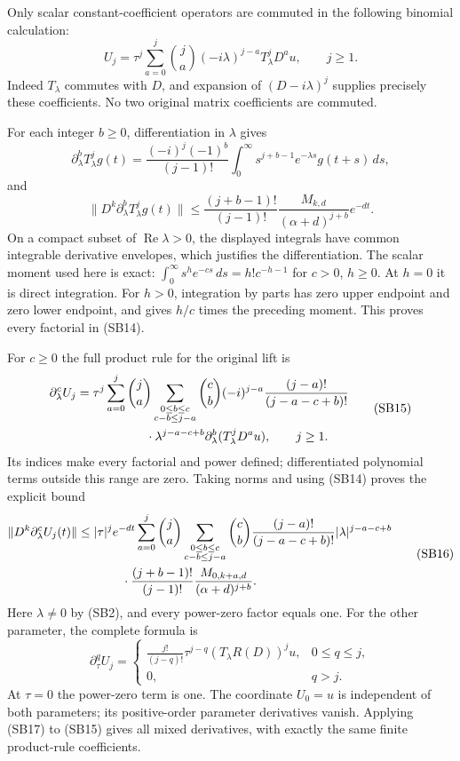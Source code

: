 \documentclass[
  11pt,
]{article}
\begin{document}
Only scalar constant-coefficient operators are commuted in the following
binomial calculation: \[
 U_j=\tau^j\sum_{a=0}^j\binom ja(-i\lambda)^{j-a}
                      T_\lambda^jD^au,\qquad j\geq1.
 \tag{SB12}
\] Indeed \(T_\lambda\) commutes with \(D\), and expansion of
\((D-i\lambda)^j\) supplies precisely these coefficients. No two
original matrix coefficients are commuted.

For each integer \(b\geq0\), differentiation in \(\lambda\) gives \[
 \partial_\lambda^bT_\lambda^jg(t)
  =\frac{(-i)^j(-1)^b}{(j-1)!}
       \int_0^\infty s^{j+b-1}e^{-\lambda s}g(t+s)\,ds,
 \tag{SB13}
\] and \[
 \|D^k\partial_\lambda^bT_\lambda^jg(t)\|
 \leq\frac{(j+b-1)!}{(j-1)!}
       \frac{M_{k,d}}{(\alpha+d)^{j+b}}e^{-dt}.
 \tag{SB14}
\] On a compact subset of \(\operatorname{Re}\lambda>0\), the displayed
integrals have common integrable derivative envelopes, which justifies
the differentiation. The scalar moment used here is exact:
\(\int_0^\infty s^he^{-cs}\,ds=h!c^{-h-1}\) for \(c>0\), \(h\geq0\). At
\(h=0\) it is direct integration. For \(h>0\), integration by parts has
zero upper endpoint and zero lower endpoint, and gives \(h/c\) times the
preceding moment. This proves every factorial in (SB14).

For \(c\geq0\) the full product rule for the original lift is \[
 \begin{split}
 \partial_\lambda^cU_j={}&\tau^j\sum_{a=0}^j\binom ja
   \sum_{\substack{0\leq b\leq c\\c-b\leq j-a}}
    \binom cb(-i)^{j-a}\frac{(j-a)!}{(j-a-c+b)!}\\
 &\hspace{15mm}\cdot\lambda^{j-a-c+b}
       \partial_\lambda^b(T_\lambda^jD^au),\qquad j\geq1.
 \end{split}
 \tag{SB15}
\] Its indices make every factorial and power defined; differentiated
polynomial terms outside this range are zero. Taking norms and using
(SB14) proves the explicit bound \[
 \begin{split}
 \|D^k\partial_\lambda^cU_j(t)\|
 \leq{}&|\tau|^je^{-dt}\sum_{a=0}^j\binom ja
   \sum_{\substack{0\leq b\leq c\\c-b\leq j-a}}
     \binom cb\frac{(j-a)!}{(j-a-c+b)!}
             |\lambda|^{j-a-c+b}\\
 &\hspace{8mm}\cdot\frac{(j+b-1)!}{(j-1)!}
             \frac{M_{0,k+a,d}}{(\alpha+d)^{j+b}}.
 \end{split}
 \tag{SB16}
\] Here \(\lambda\ne0\) by (SB2), and every power-zero factor equals
one. For the other parameter, the complete formula is \[
 \partial_\tau^qU_j=
 \begin{cases}
 \displaystyle\frac{j!}{(j-q)!}\tau^{j-q}(T_\lambda R(D))^ju,
                                      &0\leq q\leq j,\\
 0,&q>j.
 \end{cases}
 \tag{SB17}
\] At \(\tau=0\) the power-zero term is one. The coordinate \(U_0=u\) is
independent of both parameters; its positive-order parameter derivatives
vanish. Applying (SB17) to (SB15) gives all mixed derivatives, with
exactly the same finite product-rule coefficients.
\end{document}
